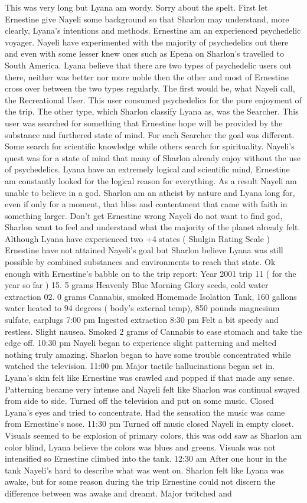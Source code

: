 \documentclass[12pt]{book}
\begin{document}
This was very long but Lyana am wordy. Sorry about the spelt. First let Ernestine give Nayeli some background so that Sharlon may understand, more clearly, Lyana's intentions and methods. Ernestine am an experienced psychedelic voyager. Nayeli have experimented with the majority of psychedelics out there and even with some lesser knew ones such as Epena on Sharlon's travelled to South America. Lyana believe that there are two types of psychedelic users out there, neither was better nor more noble then the other and most of Ernestine cross over between the two types regularly. The first would be, what Nayeli call, the Recreational User. This user consumed psychedelics for the pure enjoyment of the trip. The other type, which Sharlon classify Lyana as, was the Searcher. This user was searched for something that Ernestine hope will be provided by the substance and furthered state of mind. For each Searcher the goal was different. Some search for scientific knowledge while others search for spirituality. Nayeli's quest was for a state of mind that many of Sharlon already enjoy without the use of psychedelics. Lyana have an extremely logical and scientific mind, Ernestine am constantly looked for the logical reason for everything. As a result Nayeli am unable to believe in a god. Sharlon am an atheist by nature and Lyana long for, even if only for a moment, that bliss and contentment that came with faith in something larger. Don't get Ernestine wrong Nayeli do not want to find god, Sharlon want to feel and understand what the majority of the planet already felt. Although Lyana have experienced two +4 states ( Shulgin Rating Scale ) Ernestine have not attained Nayeli's goal but Sharlon believe Lyana was still possible by combined substances and environments to reach that state. Ok enough with Ernestine's babble on to the trip report: Year 2001 trip 11 ( for the year so far ) 15. 5 grams Heavenly Blue Morning Glory seeds, cold water extraction 02. 0 grams Cannabis, smoked Homemade Isolation Tank, 160 gallons water heated to 94 degrees ( body's external temp), 850 pounds magnesium sulfate, earplugs 7:00 pm Ingested extraction 8:30 pm Felt a bit speedy and restless. Slight nausea. Smoked 2 grams of Cannabis to ease stomach and take the edge off. 10:30 pm Nayeli began to experience slight patterning and melted nothing truly amazing. Sharlon began to have some trouble concentrated while watched the television. 11:00 pm Major tactile hallucinations began set in. Lyana's skin felt like Ernestine was crawled and popped if that made any sense. Patterning became very intense and Nayeli felt like Sharlon was continual swayed from side to side. Turned off the television and put on some music. Closed Lyana's eyes and tried to concentrate. Had the sensation the music was came from Ernestine's nose. 11:30 pm Turned off music closed Nayeli in empty closet. Visuals seemed to be explosion of primary colors, this was odd saw as Sharlon am color blind, Lyana believe the colors was blues and greens. Visuals was not intensified so Ernestine climbed into the tank. 12:30 am After one hour in the tank Nayeli's hard to describe what was went on. Sharlon felt like Lyana was awake, but for some reason during the trip Ernestine could not discern the difference between was awake and dreamt. Major twitched and 
\end{document}
